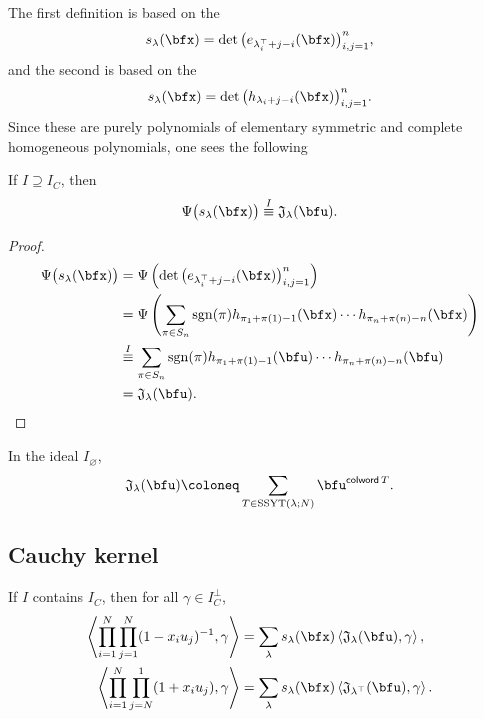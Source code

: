 \documentclass{article}
\newcommand{\ip}[1]{
    \left\langle
        {#1}
    \right\rangle
}
\newcommand*\colword{\operatorname{\mathsf{colword}}}
\newcommand*\frkJ{\mathfrak{J}}
\newcommand*\SSYT{\operatorname{SSYT}}
\newcommand*\sgn{\operatorname{sgn}}
\begin{document}
The first definition is based on the 
\[
    s_\lambda(\bfx)
    =
    \det\big(e_{\lambda^\top_i+j-i}(\bfx)\big)_{i,j=1}^n,
\]
and the second is based on the 
\[
    s_\lambda(\bfx)
    =
    \det\big(h_{\lambda_i+j-i}(\bfx)\big)_{i,j=1}^n.
\]
Since these are purely polynomials of elementary symmetric and complete homogeneous polynomials, one sees the following
\begin{definition}
    If $I \supseteq I_C$, then
    \[
        \Psi\big(s_\lambda(\bfx)\big)
        \overset{I}{\equiv}
        \frkJ_\lambda(\bfu).
    \]
\end{definition}
\begin{proof}
    \begin{align*}
        \Psi\big(s_\lambda(\bfx)\big)
        &=
        \Psi \left(
            \det\big(e_{\lambda^\top_i+j-i}(\bfx)\big)_{i,j=1}^n
        \right)
        \\
        &=
        \Psi \left(
            \sum_{\pi \in S_n}
            \sgn(\pi)
            h_{\pi_1+\pi(1)-1}(\bfx)
            \cdots
            h_{\pi_n+\pi(n)-n}(\bfx)
        \right)
        \\
        &\overset{I}{\equiv}
        \sum_{\pi \in S_n}
        \sgn(\pi)
        h_{\pi_1+\pi(1)-1}(\bfu)
        \cdots
        h_{\pi_n+\pi(n)-n}(\bfu)
        \\
        &=
        \frkJ_\lambda(\bfu).
    \end{align*}
\end{proof}

\begin{theorem}
    In the ideal $I_\varnothing$,
    \[
        \frkJ_\lambda(\bfu)
        \coloneq
        \sum_{T \in \SSYT(\lambda;N)}
        \bfu^{\colword T}.
    \]
\end{theorem}

\subsection{Cauchy kernel}

\begin{theorem}
    If $I$ contains $I_C$, then for all $\gamma \in I_C^\perp$,
    \begin{align}
        \label{eq:CauchyNC}
        \ip{
            \prod_{i=1}^N
            \prod_{j=1}^N
            (1 - x_iu_j)^{-1},
            \gamma
        }
        &=
        \sum_\lambda
        s_\lambda(\bfx)
        \ip{
        \frkJ_\lambda(\bfu),\gamma
        },
        \\
        \label{eq:DualCauchyNC}
        \ip{
            \prod_{i=1}^N
            \prod_{j=N}^1
            (1 + x_iu_j),
            \gamma
        }
        &=
        \sum_\lambda
        s_\lambda(\bfx)
        \ip{
        \frkJ_{\lambda^\top}(\bfu),\gamma
        }.
    \end{align}
\end{theorem}
\end{document}
